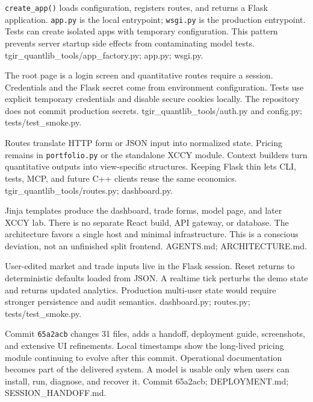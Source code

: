 
{\texttt{create\_app()} loads configuration, registers routes, and returns a Flask application.}
{\texttt{app.py} is the local entrypoint; \texttt{wsgi.py} is the production entrypoint.}
{Tests can create isolated apps with temporary configuration.}
{This pattern prevents server startup side effects from contaminating model tests.}
{tgir\_quantlib\_tools/app\_factory.py; app.py; wsgi.py.}

{The root page is a login screen and quantitative routes require a session.}
{Credentials and the Flask secret come from environment configuration.}
{Tests use explicit temporary credentials and disable secure cookies locally.}
{The repository does not commit production secrets.}
{tgir\_quantlib\_tools/auth.py and config.py; tests/test\_smoke.py.}

{Routes translate HTTP form or JSON input into normalized state.}
{Pricing remains in \texttt{portfolio.py} or the standalone XCCY module.}
{Context builders turn quantitative outputs into view-specific structures.}
{Keeping Flask thin lets CLI, tests, MCP, and future C++ clients reuse the same economics.}
{tgir\_quantlib\_tools/routes.py; dashboard.py.}

{Jinja templates produce the dashboard, trade forms, model page, and later XCCY lab.}
{There is no separate React build, API gateway, or database.}
{The architecture favors a single host and minimal infrastructure.}
{This is a conscious deviation, not an unfinished split frontend.}
{AGENTS.md; ARCHITECTURE.md.}

{User-edited market and trade inputs live in the Flask session.}
{Reset returns to deterministic defaults loaded from JSON.}
{A realtime tick perturbs the demo state and returns updated analytics.}
{Production multi-user state would require stronger persistence and audit semantics.}
{dashboard.py; routes.py; tests/test\_smoke.py.}

{Commit \texttt{65a2acb} changes 31 files, adds a handoff, deployment guide, screenshots, and extensive UI refinements.}
{Local timestamps show the long-lived pricing module continuing to evolve after this commit.}
{Operational documentation becomes part of the delivered system.}
{A model is usable only when users can install, run, diagnose, and recover it.}
{Commit 65a2acb; DEPLOYMENT.md; SESSION\_HANDOFF.md.}

